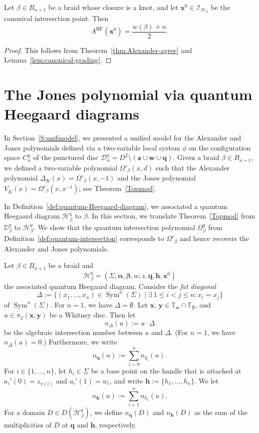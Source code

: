 \documentclass[11pt]{amsart}
\numberwithin{equation}{section}
\numberwithin{figure}{section}
\theoremstyle{definition}
\newcommand{\cD}{\mathcal{D}}
\newcommand{\cH}{\mathcal{H}}
\newcommand{\cI}{\mathcal{I}}
\newcommand{\bD}{\mathbb{D}}
\newcommand{\bT}{\mathbb{T}}
\newcommand{\mK}{\overline{K}}
\DeclareMathOperator{\Sym}{Sym}
\DeclareMathOperator{\HF}{HF}
\newcommand{\as}{\boldsymbol{\alpha}}
\newcommand{\bs}{\boldsymbol{\beta}}
\newcommand{\hs}{\boldsymbol{h}}
\newcommand{\qs}{\boldsymbol{q}}
\newcommand{\ws}{\boldsymbol{w}}
\newcommand{\xs}{\boldsymbol{x}}
\newcommand{\ys}{\boldsymbol{y}}
\newcommand{\zs}{\boldsymbol{z}}
\begin{document}
\begin{coro}\label{coro:canonical-HF-grading}
Let $\beta \in B_{n+1}$ be a braid whose closure is a knot, and let $\xs^0 \in \cI_{\cH_\beta}$ be the canonical intersection point. Then    
\[
A^{\HF}(\xs^0) = \frac{w(\beta)+n}{2}. 
\]
\end{coro}

\begin{proof}
    This follows from Theorem~\ref{thm:Alexander-agree} and Lemma~\ref{lem:canonical-grading}. 
\end{proof}

\section{The Jones polynomial via quantum Heegaard diagrams}\label{sec:unification} 

In Section~\ref{S:unifmodel}, we presented a unified model for the Alexander and Jones polynomials defined via a two-variable local system $\phi$ on the configuration space $C^q_n$ of the punctured disc $\cD^q_n = D^2 \setminus (\zs \cup \ws \cup \qs)$. Given a braid $\beta \in B_{n+1}$, we defined a two-variable polynomial $\Omega'_\beta(x,d)$ such that the Alexander polynomial $\Delta_K(x) = \Omega'_\beta(x,-1)$ and the Jones polynomial $V_{\mK}(x) = \Omega'_\beta(x,x^{-1})$; see Theorem~\ref{Topmod}.

In Definition~\ref{def:quantum-Heegaard-diagram}, we associated a quantum Heegaard diagram $\cH_\beta^q$ to $\beta$. In this section, we translate Theorem~\ref{Topmod} from $\bD_\beta^q$ to $\cH_\beta^q$. We show that the quantum intersection polynomial $\Omega^q_\beta$ from Definition~\ref{def:quantum-intersection} corresponds to $\Omega'_\beta$ and hence recovers the Alexander and Jones polynomials.

\begin{defn}
Let $\beta \in B_{n+1}$ be a braid and 
\[
\cH_\beta^q = (\Sigma,\as,\bs, w, z, \qs, \hs, \xs^0) 
\]
the associated quantum Heegaard diagram. Consider the \emph{fat diagonal}
\[
\Delta :=\{ (x_1,\dots,x_n) \in \Sym^n(\Sigma) \mid \exists \ 1\leq i < j \leq n : x_i=x_j \}
\]
of $\Sym^n(\Sigma)$. For $n=1$, we have $\Delta = \emptyset$. Let $\xs$, $\ys \in \bT_{\as} \cap \bT_{\bs}$, and $u \in \pi_2(\xs,\ys)$ be a Whitney disc. Then let
\[
n_\Delta(u) := u \cdot \Delta
\]
be the algebraic intersection number between $u$ and $\Delta$. (For $n=1$, we have $n_\Delta(u)=0$.) Furthermore, we write
\[
n_{\qs}(u) := \sum_{i=0}^n n_{q_i}(u).
\]
For $i \in \{1,\dots,n\}$, let $h_i \in \Sigma$ be a base point on the handle that is attached at $a_i'(0) = z_{\pi(i)}$ and $a_i'(1) = w_i$, and write $\hs := \{h_1, \dots, h_n\}$. We let
\[
n_{\hs}(u) := \sum_{i=1}^n n_{h_i}(u).
\]
For a domain $D \in D(\cH_\beta^q)$, we define $n_{\qs}(D)$ and $n_{\hs}(D)$ as the sum of the multiplicities of $D$ at $\qs$ and $\hs$, respectively.
\end{defn}
\end{document}
